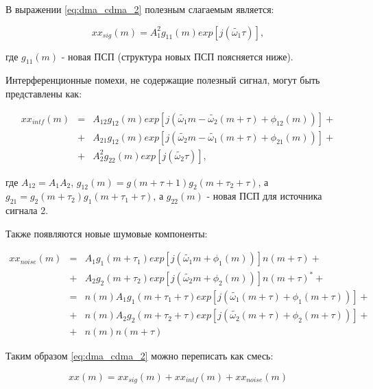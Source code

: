 В выражении \ref{eq:dma_cdma_2} полезным слагаемым является:
\begin{center}
\begin{equation}
	\label{eq:dma_cdma_3}
	xx_{sig}(m) = A^2_1 g_{11}(m) exp[j (\tilde {\omega_1} \tau)],
\end{equation}
\end{center}
где ${g_{11}(m)}$ - новая ПСП (структура новых ПСП поясняется ниже). 

Интерференционные помехи, не содержащие полезный сигнал, могут быть представлены как:
\begin{center}
\begin{eqnarray}
	\label{eq:dma_cdma_4}
	xx_{intf}(m) & = & A_{12} g_{12}(m) exp \left[ j \left( \tilde{\omega_1} m - \tilde{\omega_2}(m + \tau) + \phi_{12} (m) \right) \right] + \nonumber \\
		& + & A_{21} g_{12}(m) exp \left[ j \left( \tilde{\omega_2} m - \tilde{\omega_1}(m + \tau) + \phi_{21} (m) \right) \right] + \nonumber \\
		& + & A^2_2 g_{22}(m) exp[j (\tilde {\omega_2} \tau)],
\end{eqnarray}
\end{center}
где ${A_{12}=A_1 A_2}$, ${g_{12}(m)=g(m+\tau+1)g_2(m+\tau_2+\tau)}$, а ${g_{21} = g_2(m+\tau_2)g_1(m+\tau_1+\tau)}$, а ${g_{22}(m)}$ - новая ПСП для источника сигнала 2.

Также появляются новые шумовые компоненты:
\begin{center}
\begin{eqnarray}
	\label{eq:dma_cdma_5}
	xx_{noise}(m) & = & A_{1} g_{1}(m + \tau_1) exp \left[ j \left( \tilde{\omega_1} m + \phi_{1} (m) \right) \right] n(m + \tau) + \nonumber \\
		& + & A_{2} g_{2}(m + \tau_2) exp \left[ j \left( \tilde{\omega_2} m + \phi_{2} (m) \right) \right] n(m + \tau)^* + \nonumber \\
		& = & n(m)A_{1} g_{1}(m + \tau_1 + \tau) exp \left[ j \left( \tilde{\omega_1} (m + \tau) + \phi_{1} (m + \tau) \right) \right] + \nonumber \\
		& + & n(m)A_{2} g_{2}(m + \tau_2 + \tau) exp \left[ j \left( \tilde{\omega_2} (m + \tau) + \phi_{2} (m + \tau) \right) \right] + \nonumber \\
		& + & n(m)n(m+\tau)
\end{eqnarray}
\end{center}

Таким образом \ref{eq:dma_cdma_2} можно переписать как смесь:
\begin{center}
\begin{equation}
	\label{eq:dma_cdma_6}
	xx(m) = xx_{sig}(m) + xx_{intf}(m) + xx_{noise}(m)
\end{equation}
\end{center}

